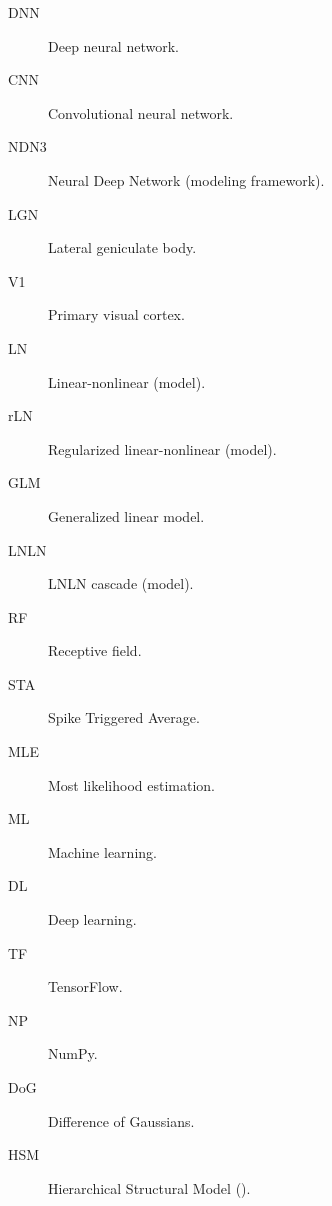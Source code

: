 
\begin{description}
	
	\item[DNN] Deep neural network.
	
	\item[CNN] Convolutional neural network.
	
	\item[NDN3] Neural Deep Network (modeling framework).
	
	\item[LGN] Lateral geniculate body.
	
	\item[V1] Primary visual cortex.
	
	\item[LN] Linear-nonlinear (model).

	\item[rLN] Regularized linear-nonlinear (model).

	\item[GLM] Generalized linear model.

	\item[LNLN] LNLN cascade (model).

	\item[RF] Receptive field.

	\item[STA] Spike Triggered Average.

	\item[MLE] Most likelihood estimation.

	\item[ML] Machine learning.

	\item[DL] Deep learning.

	\item[TF] TensorFlow.

	\item[NP] NumPy.

	\item[DoG] Difference of Gaussians.

	\item[HSM] Hierarchical Structural Model (\cite{antolik}).
	
\end{description}

